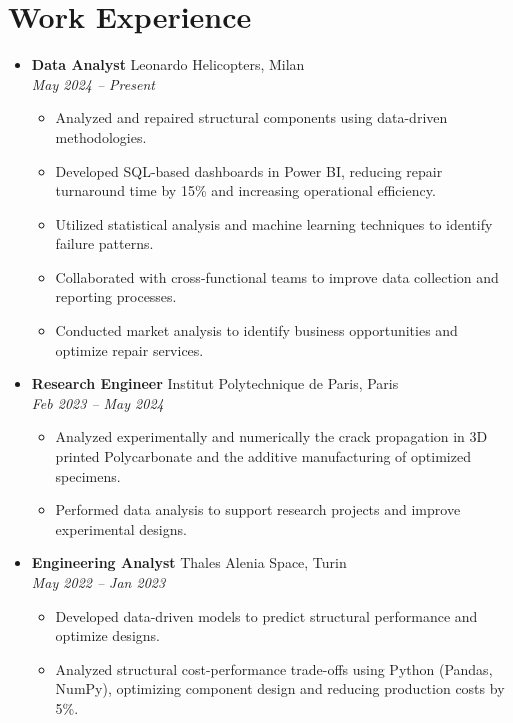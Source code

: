 \documentclass[letterpaper,10.5pt]{article}
\newcommand{\resumeEntry}[4]{
  \item\textbf{#1} \hfill #2\\
  \textit{#3} \hfill \textit{#4}
}
\newcommand{\resumeDescription}[1]{
  \vspace{-3pt}\begin{itemize}[leftmargin=0.2in]
    #1
  \end{itemize}
}
\begin{document}
\section*{Work Experience}
\begin{itemize}[leftmargin=0.2in]
    \resumeEntry{Data Analyst}{Leonardo Helicopters, Milan}{May 2024 -- Present}{}
    \resumeDescription{
        \item Analyzed and repaired structural components using data-driven methodologies.
        \item Developed SQL-based dashboards in Power BI, reducing repair turnaround time by 15\% and increasing operational efficiency.
        \item Utilized statistical analysis and machine learning techniques to identify failure patterns.
        \item Collaborated with cross-functional teams to improve data collection and reporting processes.
        \item Conducted market analysis to identify business opportunities and optimize repair services.
    }
    \resumeEntry{Research Engineer}{Institut Polytechnique de Paris, Paris}{Feb 2023 -- May 2024}{}
    \resumeDescription{
        \item Analyzed experimentally and numerically the crack propagation in 3D printed Polycarbonate and the additive manufacturing of optimized specimens.
        \item Performed data analysis to support research projects and improve experimental designs.
    }
    \resumeEntry{Engineering Analyst}{Thales Alenia Space, Turin}{May 2022 -- Jan 2023}{}
    \resumeDescription{
        \item Developed data-driven models to predict structural performance and optimize designs.
        \item Analyzed structural cost-performance trade-offs using Python (Pandas, NumPy), optimizing component design and reducing production costs by 5\%.
    }
\end{itemize}

\end{document}
